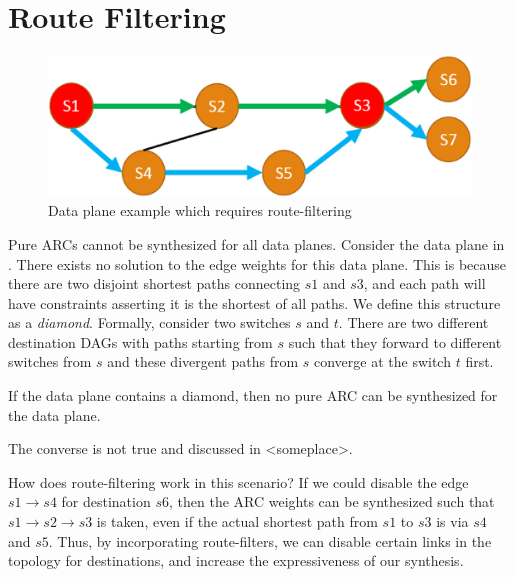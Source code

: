 \section{Route Filtering}
\begin{figure}[h!] 
	\centering
	\includegraphics[width=\columnwidth]{figures/diamond.eps}
	\caption{Data plane example which requires route-filtering} \label{fig:diamond}
\end{figure}
Pure ARCs cannot be synthesized for all data planes. Consider the data
plane in . 
There exists no solution to the edge weights for this data plane. This is because 
there are two disjoint shortest paths connecting $s1$ and $s3$, and each path will have constraints
asserting it is the shortest of all paths. We define this structure as a \emph{diamond}. 
Formally,
consider two switches $s$ and $t$. There are two different destination DAGs with 
paths starting from $s$ such that they forward to different switches from $s$  
and these divergent paths from $s$ converge
at the switch $t$ first. 
\begin{theorem}
If the data plane contains a diamond, then no pure ARC  
can be synthesized for the data plane.
\end{theorem}
The converse is not true and discussed in <someplace>.

How does route-filtering work in this scenario? If we could disable the edge
$s1 \rightarrow s4$ for destination $s6$, then the ARC weights can be synthesized
such that $s1 \rightarrow s2 \rightarrow s3$ is taken, even if the actual shortest path
from $s1$ to $s3$ is via $s4$ and $s5$. Thus, by incorporating route-filters, we can
disable certain links in the topology for destinations, and increase the 
expressiveness of our synthesis. 
